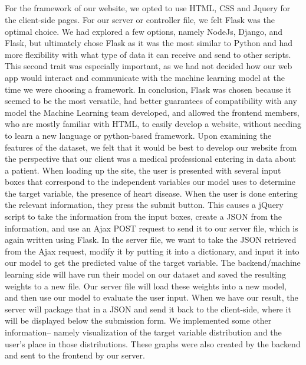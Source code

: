 \documentclass[12pt]{article}
\begin{document}
\subsection*{}
For the framework of our website, we opted to use HTML, CSS and Jquery for the client-side pages. For our server or controller file, we felt Flask was the optimal choice. We had explored a few options, namely NodeJs, Django, and Flask, but ultimately chose Flask as it was the most similar to Python and had more flexibility with what type of data it can receive and send to other scripts. This second trait was especially important, as we had not decided how our web app would interact and communicate with the machine learning model at the time we were choosing a framework. In conclusion, Flask was chosen because it seemed to be the most versatile, had better guarantees of compatibility with any model the Machine Learning team developed, and allowed the frontend members, who are mostly familiar with HTML, to easily develop a website, without needing to learn a new language or python-based framework. 
	Upon examining the features of the dataset, we felt that it would be best to develop our website from the perspective that our client was a medical professional entering in data about a patient. When loading up the site, the user is presented with several input boxes that correspond to the independent variables our model uses to determine the target variable, the presence of heart disease. When the user is done entering the relevant information, they press the submit button. This causes a jQuery script to take the information from the input boxes, create a JSON from the information, and use an Ajax POST request to send it to our server file, which is again written using Flask. In the server file, we want to take the JSON retrieved from the Ajax request, modify it by putting it into a dictionary, and input it into our model to get the predicted value of the target variable. The backend/machine learning side will have run their model on our dataset and saved the resulting weights to a new file. Our server file will load these weights into a new model, and then use our model to evaluate the user input. When we have our result, the server will package that in a JSON and send it back to the client-side, where it will be displayed below the submission form.
	We implemented some other information-- namely visualization of the target variable distribution and the user's place in those distributions. These graphs were also created by the backend and sent to the frontend by our server.
\end{document}
